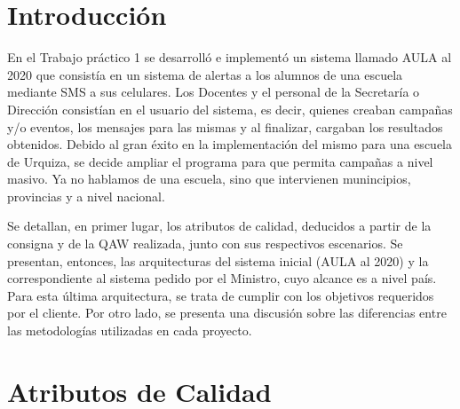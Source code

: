 \documentclass[a4paper, 11pt]{article}
\begin{document}
\pagestyle{myheadings}
\maketitle

\thispagestyle{empty}
\tableofcontents

\newpage

\section{Introducci\'on}
En el Trabajo práctico 1 se desarrolló e implementó un sistema llamado AULA al 2020 que consistía en un sistema de alertas a los alumnos de una escuela mediante SMS a sus celulares. Los Docentes y el personal de la Secretaría o Dirección consistían en el usuario del sistema, es decir, quienes creaban campañas y/o eventos, los mensajes para las mismas y al finalizar, cargaban los resultados obtenidos. Debido al gran éxito en la implementación del mismo para una escuela de Urquiza, se decide ampliar el programa para que permita campañas a nivel masivo. Ya no hablamos de una escuela, sino que intervienen munincipios, provincias y a nivel nacional. 

Se detallan, en primer lugar, los atributos de calidad, deducidos a partir de la consigna y de la QAW realizada, junto con sus respectivos escenarios. 
Se presentan, entonces, las arquitecturas del sistema inicial (AULA al 2020) y la correspondiente al sistema pedido por el Ministro, cuyo alcance es a nivel país. Para esta última arquitectura, se trata de cumplir con los objetivos requeridos por el cliente. Por otro lado, se presenta una discusión sobre las diferencias entre las metodologías utilizadas en cada proyecto.


\newpage
\section{Atributos de Calidad}
\end{document}
